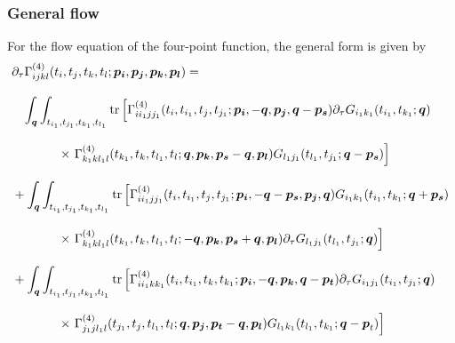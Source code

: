 \documentclass[reprint,english,superscriptaddress,preprintnumbers,amsmath,amssymb,aps,prd]{revtex4-1}
\begin{document}
\subsubsection{General flow}

For the flow equation of the four-point function, the general form is given by
\begin{align}
    \partial_{\tau}\Gamma_{ijkl}^{(4)}(t_i,t_j,t_k,t_l;\boldsymbol{p_{i}},\boldsymbol{p_{j}},\boldsymbol{p_{k}},\boldsymbol{p_{l}})=&\nonumber\\[2ex]
    &\hspace{-5cm}\int_{\boldsymbol{q}}\int_{t_{i_1},t_{j_1},t_{k_1},t_{l_1}}\mathrm{tr}\left[\Gamma_{ii_{1}jj_{1}}^{(4)}(t_i,t_{i_1},t_j,t_{j_1};\boldsymbol{p_{i}},-\boldsymbol{q},\boldsymbol{p_{j}},\boldsymbol{q}-\boldsymbol{p_{s}})\partial_{\tau}G_{i_{1}k_{1}}(t_{i_1},t_{k_1};\boldsymbol{q})\right.\nonumber\\[2ex]&\hspace{-4cm}\times\left.\Gamma_{k_{1}kl_{1}l}^{(4)}(t_{k_1},t_k,t_{l_1},t_l;\boldsymbol{q},\boldsymbol{p_{k}},\boldsymbol{p_s}-\boldsymbol{q},\boldsymbol{p_{l}})G_{l_{1}j_{1}}(t_{l_1},t_{j_1};\boldsymbol{q}-\boldsymbol{p_s})\right]\nonumber\\[2ex]
    &\hspace{-5.3cm}+\int_{\boldsymbol{q}}\int_{t_{i_1},t_{j_1},t_{k_1},t_{l_1}}\mathrm{tr}\left[\Gamma_{ii_{1}jj_{1}}^{(4)}(t_i,t_{i_1},t_j,t_{j_1};\boldsymbol{p_{i}},-\boldsymbol{q}-\boldsymbol{p_{s}},\boldsymbol{p_{j}},\boldsymbol{q})G_{i_{1}k_{1}}(t_{i_1},t_{k_1};\boldsymbol{q}+\boldsymbol{p_s})\right.\nonumber\\[2ex]&\hspace{-4cm}\times\left.\Gamma_{k_{1}kl_{1}l}^{(4)}(t_{k_1},t_k,t_{l_1},t_l;-\boldsymbol{q},\boldsymbol{p_{k}},\boldsymbol{p_s}+\boldsymbol{q},\boldsymbol{p_{l}})\partial_{\tau}G_{l_{1}j_{1}}(t_{l_1},t_{j_1};\boldsymbol{q})\right]\nonumber\\[2ex]
    &\hspace{-5.3cm}+\int_{\boldsymbol{q}}\int_{t_{i_1},t_{j_1},t_{k_1},t_{l_1}}\mathrm{tr}\left[\Gamma_{ii_{1}kk_{1}}^{(4)}(t_i,t_{i_1},t_k,t_{k_1};\boldsymbol{p_{i}},-\boldsymbol{q},\boldsymbol{p_{k}},\boldsymbol{q}-\boldsymbol{p_{t}})\partial_{\tau}G_{i_{1}j_{1}}(t_{i_1},t_{j_1};\boldsymbol{q})\right.\nonumber\\[2ex]&\hspace{-4cm}\times\left.\Gamma_{j_{1}jl_{1}l}^{(4)}(t_{j_1},t_j,t_{l_1},t_l;\boldsymbol{q},\boldsymbol{p_{j}},\boldsymbol{p_t}-\boldsymbol{q},\boldsymbol{p_{l}})G_{l_{1}k_{1}}(t_{l_1},t_{k_1};\boldsymbol{q}-\boldsymbol{p}_{t})\right]\nonumber\\[2ex]

\end{align}
\end{document}
